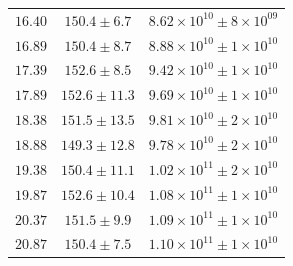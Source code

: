 \documentclass{article}
\begin{document}
\begin{table}[h!]
\begin{tabular}{|c|c|c|}
        $16.40$ & $150.4 \pm 6.7$ & $8.62\times 10^{10} \pm 8\times 10^{09}$ \\
        $16.89$ & $150.4 \pm 8.7$ & $8.88\times 10^{10} \pm 1\times 10^{10}$ \\
        $17.39$ & $152.6 \pm 8.5$ & $9.42\times 10^{10} \pm 1\times 10^{10}$ \\
        $17.89$ & $152.6 \pm 11.3$ & $9.69\times 10^{10} \pm 1\times 10^{10}$ \\
        $18.38$ & $151.5 \pm 13.5$ & $9.81\times 10^{10} \pm 2\times 10^{10}$ \\
        $18.88$ & $149.3 \pm 12.8$ & $9.78\times 10^{10} \pm 2\times 10^{10}$ \\
        $19.38$ & $150.4 \pm 11.1$ & $1.02\times 10^{11} \pm 2\times 10^{10}$ \\
        $19.87$ & $152.6 \pm 10.4$ & $1.08\times 10^{11} \pm 1\times 10^{10}$ \\
        $20.37$ & $151.5 \pm 9.9$ & $1.09\times 10^{11} \pm 1\times 10^{10}$ \\
        $20.87$ & $150.4 \pm 7.5$ & $1.10\times 10^{11} \pm 1\times 10^{10}$ \\
        \hline
    \end{tabular}
\end{table}

\doublespacing
\end{document}
